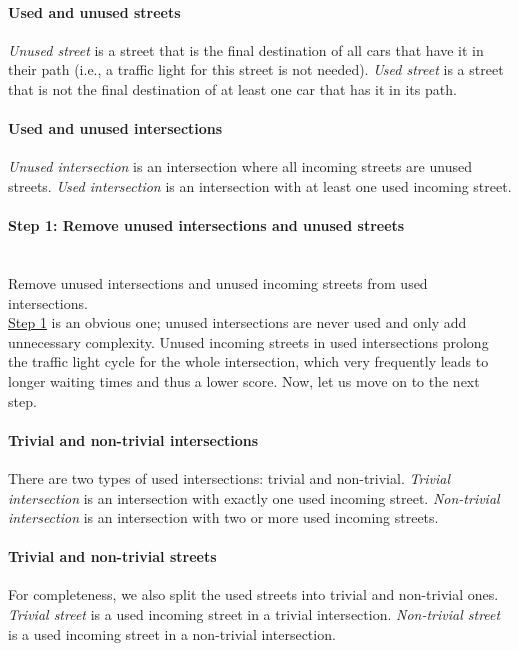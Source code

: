 \paragraph{Used and unused streets}
\textit{Unused street} is a street that is the final destination of all cars that have it in their path (i.e., a traffic light for this street is not needed).
\textit{Used street} is a street that is not the final destination of at least one car that has it in its path.

\paragraph{Used and unused intersections} \textit{Unused intersection} is an intersection where all incoming streets are unused streets. \textit{Used intersection} is an intersection with at least one used incoming street.

\paragraph{Step 1: Remove unused intersections and unused streets} \label{para:step_1} \mbox{} \\
Remove unused intersections and unused incoming streets from used intersections. \\

\hyperref[para:step_1]{Step 1} is an obvious one; unused intersections are never used and only add unnecessary complexity. Unused incoming streets in used intersections prolong the traffic light cycle for the whole intersection, which very frequently leads to longer waiting times and thus a lower score. Now, let us move on to the next step.

\paragraph{Trivial and non-trivial intersections}
There are two types of used intersections: trivial and non-trivial.
\textit{Trivial intersection} is an intersection with exactly one used incoming street. \textit{Non-trivial intersection} is an intersection with two or more used incoming streets.

\paragraph{Trivial and non-trivial streets}
For completeness, we also split the used streets into trivial and non-trivial ones.
\textit{Trivial street} is a used incoming street in a trivial intersection. \textit{Non-trivial street} is a used incoming street in a non-trivial intersection.

